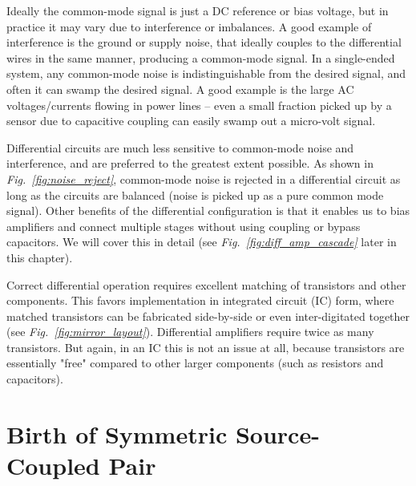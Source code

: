 Ideally the common-mode signal is just a DC reference or bias voltage, but in practice it may vary due to interference or imbalances.  A good example of interference is the ground or supply noise, that ideally couples to the differential wires in the same manner, producing a common-mode signal.  In a single-ended system, any common-mode noise is indistinguishable from the desired signal, and often it can swamp the desired signal.  A good example is the large AC voltages/currents flowing in power lines -- even a small fraction picked up by a sensor due to capacitive coupling can easily swamp out a micro-volt signal.  

Differential circuits are much less sensitive to common-mode noise and interference, and are preferred to the greatest extent possible.  As shown in \emph{Fig.~\ref{fig:noise_reject}}, common-mode noise is rejected in a differential circuit as long as the circuits are balanced (noise is picked up as a pure common mode signal).  Other benefits of the differential configuration is that it enables us to bias amplifiers and connect multiple stages without using coupling or bypass capacitors.  We will cover this in detail (see \emph{Fig.~\ref{fig:diff_amp_cascade}} later in this chapter).  

Correct differential operation requires excellent matching of transistors and other components.  This favors implementation in integrated circuit (IC) form, where matched transistors can be fabricated side-by-side or even inter-digitated together (see \emph{Fig.~\ref{fig:mirror_layout}}).  Differential amplifiers require twice as many transistors.  But again, in an IC this is not an issue at all, because transistors are essentially "free" compared to other larger components (such as resistors and capacitors).
\section{Birth of Symmetric Source-Coupled Pair}

